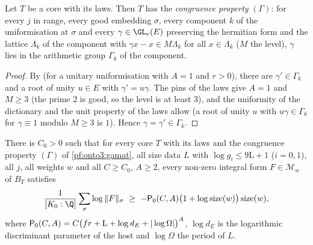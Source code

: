 \begin{lemma}\label{pf:onto3:gamat}
Let $T$ be a core with its laws. Then $T$ has the \emph{congruence property} $(\Gamma)$: for every $j$ in range, every good
embedding $\sigma$, every component $k$ of the uniformisation at $\sigma$ and every $\gamma\in\GL_r(E)$ preserving the
hermitian form and the lattice $\Lambda_k$ of the component with $\gamma x-x\in M\Lambda_k$ for all $x\in\Lambda_k$ ($M$ the
level), $\gamma$ lies in the arithmetic group $\Gamma_k$ of the component.
\end{lemma}

\begin{proof}
By  (for a unitary uniformisation with $A=1$ and
$r>0$), there are $\gamma'\in\Gamma_k$ and a root of unity $u\in E$ with $\gamma'=u\gamma$. The pins of the laws give $A=1$
and $M\ge3$ (the prime $2$ is good, so the level is at least $3$), and the uniformity of the dictionary and the unit
property of the laws allow  (a root of unity $u$ with $u\gamma\in\Gamma_k$ for
$\gamma\equiv1$ modulo $M\ge3$ is $1$). Hence $\gamma=\gamma'\in\Gamma_k$.
\end{proof}

\begin{proposition}\label{pf:onto3:lamw}
There is $C_0>0$ such that for every core $T$ with its laws and the congruence property $(\Gamma)$ of
\cref{pf:onto3:gamat}, all size data $L$ with $\log g_i\le9\mathrm L+1$ ($i=0,1$), all $j$, all weights $w$ and all
$C\ge C_0$, $A\ge2$, every non-zero integral form $F\in\mathcal M_w$ of $B_T$ satisfies
\[
\frac1{[K_0:\Q]}\sum_{\sigma}\log\|F\|_\sigma\ \ge\ -\ontothreePP_0(C,A)\bigl(1+\log\ontothreesize(w)\bigr)
\ontothreesize(w),
\]
where $\mathsf{P}_0(C,A)=C\bigl(fr+\mathrm L+\log d_E+|\log\Omega|\bigr)^A$, $\log d_E$ is the logarithmic discriminant
parameter of the host and $\log\Omega$ the period of $L$.
\end{proposition}

